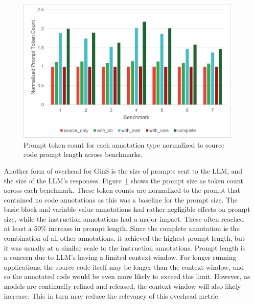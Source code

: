\documentclass[sigconf]{acmart}
\begin{document}
\begin{figure}
    \centering
    \includegraphics[width=1\linewidth]{images/PromptCost.png}
    \caption{Prompt token count for each annotation type normalized to source code prompt length across benchmarks.}
    \label{fig:prompt}
\end{figure}

Another form of overhead for GinS is the size of prompts sent to the LLM, and the size of the LLM's responses.
Figure~\ref{fig:prompt} shows the prompt size as token count across each benchmark.
These token counts are normalized to the prompt that contained no code annotations as this was a baseline for the prompt size.
The basic block and variable value annotations had rather negligible effects on prompt size, while the instruction annotations had a major impact.
These often reached at least a 50\% increase in prompt length.
Since the complete annotation is the combination of all other annotations, it achieved the highest prompt length, but it was usually at a similar scale to the instruction annotations.
Prompt length is a concern due to LLM's having a limited context window.
For longer running applications, the source code itself may be longer than the context window, and so the annotated code would be even more likely to exceed this limit.
However, as models are continually refined and released, the context window will also likely increase.
This in turn may reduce the relevancy of this overhead metric.
\end{document}
